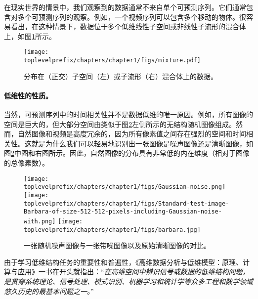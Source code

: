 \documentclass[../../book-main.tex]{subfiles}
\begin{document}
在现实世界的情景中，我们观察到的数据通常不来自单个可预测序列。它们通常包含对多个可预测序列的观察。例如，一个视频序列可以包含多个移动的物体。很容易看出，在这种情景下，数据位于多个低维线性子空间或非线性子流形的混合体上，如图\ref{fig:mixture-models}所示。
\begin{figure}
    \centering
    \texttt{[image: \\toplevelprefix/chapters/chapter1/figs/mixture.pdf]}
    \caption{分布在（正交）子空间（左）或子流形（右）混合体上的数据。}
    \label{fig:mixture-models}
\end{figure}


\paragraph{低维性的性质。}
当然，可预测序列中的时间相关性并不是数据低维的唯一原因。例如，所有图像的空间是巨大的，但大部分空间由类似于图\ref{fig:noise-image}左侧所示的无结构随机图像组成。然而，自然图像和视频是高度冗余的，因为所有像素值之间存在强烈的空间和时间相关性。这就是为什么我们可以轻易地识别出一张图像是噪声图像还是清晰图像，如图\ref{fig:noise-image}中图和右图所示。因此，自然图像的分布具有非常低的内在维度（相对于图像的总像素数）。

\begin{figure}
    \centering
    \texttt{[image: \\toplevelprefix/chapters/chapter1/figs/Gaussian-noise.png]}\hspace{2mm} \texttt{[image: \\toplevelprefix/chapters/chapter1/figs/Standard-test-image-Barbara-of-size-512-512-pixels-including-Gaussian-noise-with.png]} \hspace{2mm} \texttt{[image: \\toplevelprefix/chapters/chapter1/figs/barbara.jpg]}
    \caption{一张随机噪声图像与一张带噪图像以及原始清晰图像的对比。%
    }
    \label{fig:noise-image}
\end{figure}

由于学习低维结构任务的重要性和普遍性，《高维数据分析与低维模型：原理、计算与应用》\cite{Wright-Ma-2022}一书在开头就指出：“{\em 在高维空间中辨识信号或数据的低维结构问题，是贯穿系统理论、信号处理、模式识别、机器学习和统计学等众多工程和数学领域悠久历史的最基本问题之一。}”
\end{document}
